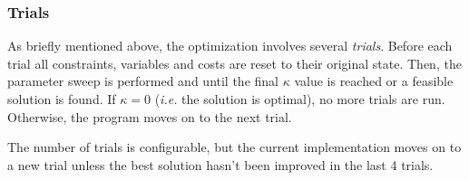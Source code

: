 \subsubsection{Trials}
As briefly mentioned above, the optimization involves several \emph{trials}.
Before each trial all constraints, variables and costs are reset to their original state.
Then, the parameter sweep is performed and until the final \(\kappa\) value is reached or a feasible solution is found.
If \(\kappa=0\) (\emph{i.e.} the solution is optimal), no more trials are run.
Otherwise, the program moves on to the next trial.

The number of trials is configurable, but the current implementation moves on to a new trial unless the best solution hasn't been improved in the last 4 trials.
